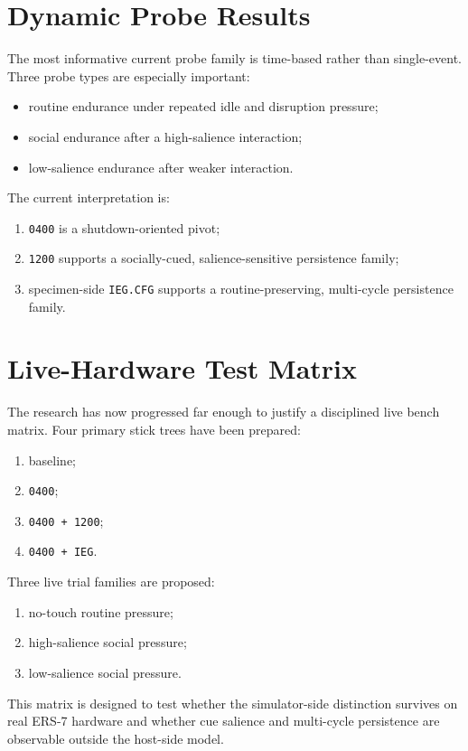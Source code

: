 \section{Dynamic Probe Results}
The most informative current probe family is time-based rather than
single-event. Three probe types are especially important:
\begin{itemize}[leftmargin=*]
\item routine endurance under repeated idle and disruption pressure;
\item social endurance after a high-salience interaction;
\item low-salience endurance after weaker interaction.
\end{itemize}

\DynamicBoundaryPresentation

The current interpretation is:
\begin{enumerate}[leftmargin=*]
\item \texttt{0400} is a shutdown-oriented pivot;
\item \texttt{1200} supports a socially-cued, salience-sensitive persistence
family;
\item specimen-side \texttt{IEG.CFG} supports a routine-preserving,
multi-cycle persistence family.
\end{enumerate}

\section{Live-Hardware Test Matrix}
The research has now progressed far enough to justify a disciplined live bench
matrix. Four primary stick trees have been prepared:
\begin{enumerate}[leftmargin=*]
\item baseline;
\item \texttt{0400};
\item \texttt{0400 + 1200};
\item \texttt{0400 + IEG}.
\end{enumerate}

Three live trial families are proposed:
\begin{enumerate}[leftmargin=*]
\item no-touch routine pressure;
\item high-salience social pressure;
\item low-salience social pressure.
\end{enumerate}

This matrix is designed to test whether the simulator-side distinction survives
on real ERS-7 hardware and whether cue salience and multi-cycle persistence are
observable outside the host-side model.

